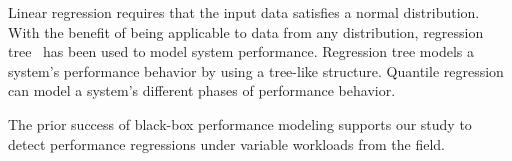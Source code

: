 Linear regression requires that the input data satisfies a normal distribution. With the benefit of being applicable to data from any distribution, regression tree~\citep{DBLP:conf/wosp/XiongPZG13} has been used to model system performance. Regression tree models a system's performance behavior by using a tree-like structure. Quantile regression~\citep{DBLP:conf/asplos/OliveiraFDHS13} can model a system's different phases of performance behavior.

The prior success of black-box performance modeling supports our study to detect performance regressions under variable workloads from the field.